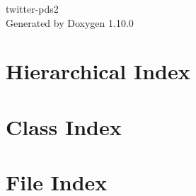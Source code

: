 \documentclass[twoside]{book}
\newcommand{\+}{\discretionary{\mbox{\scriptsize$\hookleftarrow$}}{}{}}
\newcommand{\clearemptydoublepage}{%
    \newpage{\pagestyle{empty}\cleardoublepage}%
  }
\begin{document}
  \raggedbottom
    \hypersetup{pageanchor=false,
                bookmarksnumbered=true,
                pdfencoding=unicode
               }
  \begin{titlepage}
  \vspace*{7cm}
  \begin{center}%
  {\Large twitter-\/pds2}\\
  \vspace*{1cm}
  {\large Generated by Doxygen 1.10.0}\\
  \end{center}
  \end{titlepage}
  \clearemptydoublepage
  \tableofcontents
  \clearemptydoublepage
  \hypersetup{pageanchor=true}
\chapter{Hierarchical Index}

\chapter{Class Index}

\chapter{File Index}

\end{document}
